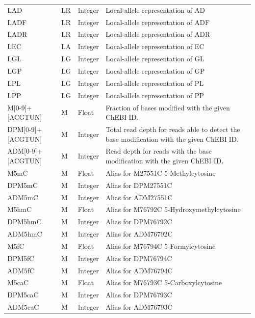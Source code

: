 \documentclass[8pt]{article}
\begin{document}
\begin{longtable}[c]{ | p{2.5cm} | p{1.5cm} | p{1.5cm} | p{10.3cm} | }
      LAD		& LR    	& Integer	& Local-allele representation of AD \\
      LADF		& LR    	& Integer	& Local-allele representation of ADF \\
      LADR		& LR    	& Integer	& Local-allele representation of ADR \\
      LEC		& LA     	& Integer	& Local-allele representation of EC \\
      LGL		& LG    	& Integer	& Local-allele representation of GL \\
      LGP		& LG    	& Integer	& Local-allele representation of GP \\
      LPL		& LG    	& Integer	& Local-allele representation of PL \\
      LPP		& LG    	& Integer	& Local-allele representation of PP \\
      M[0-9]+[ACGTUN]   & M & Float     & Fraction of bases modified with the given ChEBI ID. \\
      DPM[0-9]+[ACGTUN]	& M & Integer   & Total read depth for reads able to detect the base modification with the given ChEBI ID. \\
      ADM[0-9]+[ACGTUN]	& M & Integer   & Read depth for reads with the base modification with the given ChEBI ID. \\
      M5mC   	& M         & Float     & Alias for M27551C 5-Methylcytosine \\
      DPM5mC   	& M         & Integer   & Alias for DPM27551C \\
      ADM5mC   	& M         & Integer   & Alias for ADM27551C \\
      M5hmC   	& M         & Float     & Alias for M76792C 5-Hydroxymethylcytosine \\
      DPM5hmC   & M         & Integer   & Alias for DPM76792C \\
      ADM5hmC   & M         & Integer   & Alias for ADM76792C \\
      M5fC   	& M         & Float     & Alias for M76794C 5-Formylcytosine \\
      DPM5fC   	& M         & Integer   & Alias for DPM76794C \\
      ADM5fC   	& M         & Integer   & Alias for ADM76794C \\
      M5caC   	& M         & Float     & Alias for M76793C 5-Carboxylcytosine \\
      DPM5caC   & M         & Integer   & Alias for DPM76793C \\
      ADM5caC   & M         & Integer   & Alias for ADM76793C \\

\end{longtable}
\end{document}
